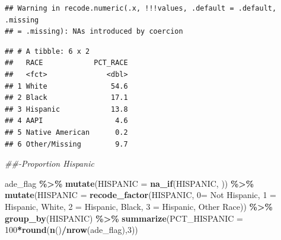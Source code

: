 \documentclass[preprint, 3p,
authoryear]{elsarticle} %
\newenvironment{Shaded}{\begin{snugshade}}{\end{snugshade}}
\newcommand{\CommentTok}[1]{\textcolor[rgb]{0.56,0.35,0.01}{\textit{#1}}}
\newcommand{\DataTypeTok}[1]{\textcolor[rgb]{0.13,0.29,0.53}{#1}}
\newcommand{\DecValTok}[1]{\textcolor[rgb]{0.00,0.00,0.81}{#1}}
\newcommand{\KeywordTok}[1]{\textcolor[rgb]{0.13,0.29,0.53}{\textbf{#1}}}
\newcommand{\NormalTok}[1]{#1}
\newcommand{\OperatorTok}[1]{\textcolor[rgb]{0.81,0.36,0.00}{\textbf{#1}}}
\newcommand{\StringTok}[1]{\textcolor[rgb]{0.31,0.60,0.02}{#1}}
\begin{document}
\begin{verbatim}
## Warning in recode.numeric(.x, !!!values, .default = .default, .missing
## = .missing): NAs introduced by coercion
\end{verbatim}

\begin{verbatim}
## # A tibble: 6 x 2
##   RACE            PCT_RACE
##   <fct>              <dbl>
## 1 White               54.6
## 2 Black               17.1
## 3 Hispanic            13.8
## 4 AAPI                 4.6
## 5 Native American      0.2
## 6 Other/Missing        9.7
\end{verbatim}

\begin{Shaded}
\begin{Highlighting}[]
\CommentTok{\#\#{-}Proportion Hispanic }

\NormalTok{ade\_flag }\OperatorTok{\%\textgreater{}\%}
\StringTok{  }\KeywordTok{mutate}\NormalTok{(}\DataTypeTok{HISPANIC =} \KeywordTok{na\_if}\NormalTok{(HISPANIC, }\StringTok{\textquotesingle{}\textquotesingle{}}\NormalTok{)) }\OperatorTok{\%\textgreater{}\%}
\StringTok{    }\KeywordTok{mutate}\NormalTok{(}\DataTypeTok{HISPANIC =} \KeywordTok{recode\_factor}\NormalTok{(HISPANIC, }\StringTok{\textasciigrave{}}\DataTypeTok{0}\StringTok{\textasciigrave{}}\NormalTok{=}\StringTok{ \textquotesingle{}Not Hispanic\textquotesingle{}}\NormalTok{,}
                                                            \StringTok{\textasciigrave{}}\DataTypeTok{1}\StringTok{\textasciigrave{}}\NormalTok{ =}\StringTok{ \textquotesingle{}Hispanic, White\textquotesingle{}}\NormalTok{,}
                                                            \StringTok{\textasciigrave{}}\DataTypeTok{2}\StringTok{\textasciigrave{}}\NormalTok{ =}\StringTok{ \textquotesingle{}Hispanic, Black\textquotesingle{}}\NormalTok{,}
                                                            \StringTok{\textasciigrave{}}\DataTypeTok{3}\StringTok{\textasciigrave{}}\NormalTok{ =}\StringTok{ \textquotesingle{}Hispanic, Other Race\textquotesingle{}}\NormalTok{)) }\OperatorTok{\%\textgreater{}\%}
\StringTok{    }\KeywordTok{group\_by}\NormalTok{(HISPANIC) }\OperatorTok{\%\textgreater{}\%}
\StringTok{    }\KeywordTok{summarize}\NormalTok{(}\DataTypeTok{PCT\_HISPANIC =} \DecValTok{100}\OperatorTok{*}\KeywordTok{round}\NormalTok{(}\KeywordTok{n}\NormalTok{()}\OperatorTok{/}\KeywordTok{nrow}\NormalTok{(ade\_flag),}\DecValTok{3}\NormalTok{))}
\end{Highlighting}
\end{Shaded}
\end{document}
